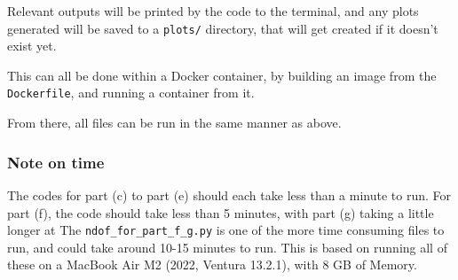 \documentclass[12pt]{report} %
\begin{document}
Relevant outputs will be printed by the code to the terminal, and any plots generated will be saved to a \texttt{plots/} directory, that will get created if it doesn't exist yet.

This can all be done within a Docker container, by building an image from the \texttt{Dockerfile}, and running a container from it. 

From there, all files can be run in the same manner as above.

\subsubsection*{Note on time} 
The codes for part (c) to part (e) should each take less than a minute to run. For part (f), the code should take less than 5 minutes, with part (g) taking a little longer at The \texttt{ndof\_for\_part\_f\_g.py} is one of the more time consuming files to run, and could take around 10-15 minutes to run. This is based on running all of these on a MacBook Air M2 (2022, Ventura 13.2.1), with 8 GB of Memory.
\end{document}

